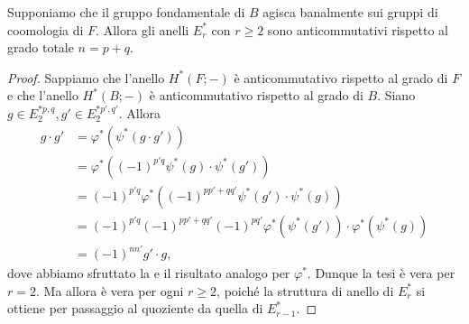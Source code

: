 \begin{corollary}
Supponiamo che il gruppo fondamentale di $B$ agisca banalmente sui gruppi di coomologia di $F$. Allora gli anelli $E^\ast_r$ con $r\ge 2$ sono anticommutativi rispetto al grado totale $n=p+q$.
\end{corollary}
\begin{proof}
Sappiamo che l'anello $H^*(F;-)$ è anticommutativo rispetto al grado di $F$ e che l'anello $H^*(B;-)$ è anticommutativo rispetto al grado di $B$. Siano $g\in E^{\ast p,q}_2,g'\in E^{\ast p',q'}_2$. Allora
\begin{align*}
g\cdot g'&=\varphi^*(\psi^*(g\cdot g'))\\
&=\varphi^*((-1)^{p'q}\psi^*(g)\cdot\psi^*(g'))\\
&=(-1)^{p'q}\varphi^*((-1)^{pp'+qq'}\psi^*(g')\cdot\psi^*(g))\\
&=(-1)^{p'q}(-1)^{pp'+qq'}(-1)^{pq'}\varphi^*(\psi^*(g'))\cdot\varphi^*(\psi^*(g))\\
&=(-1)^{nn'}g'\cdot g,
\end{align*}
dove abbiamo sfruttato la  e il risultato analogo per $\varphi^*$. Dunque la tesi è vera per $r=2$. Ma allora è vera per ogni $r\ge 2$, poiché la struttura di anello di $E^\ast_r$ si ottiene per passaggio al quoziente da quella di $E^\ast_{r-1}$.
\end{proof}

